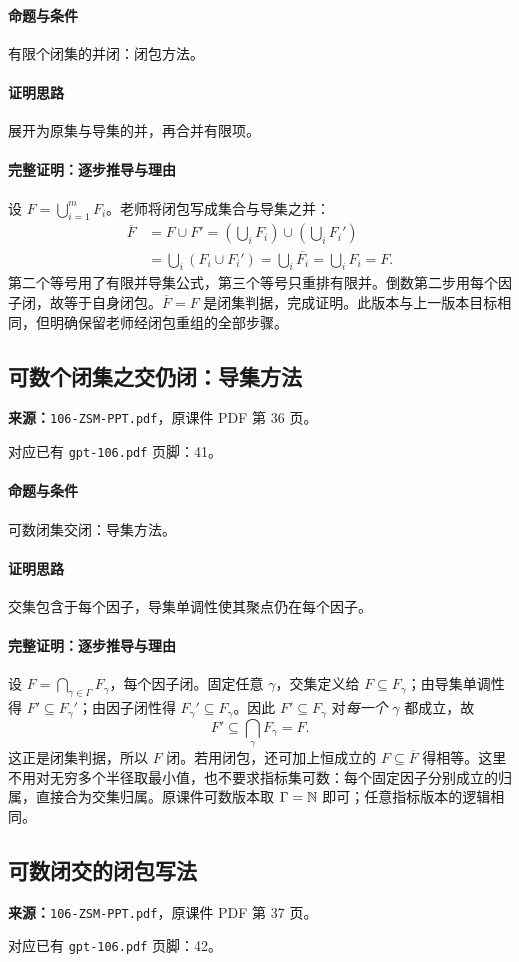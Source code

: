 \paragraph{命题与条件}有限个闭集的并闭：闭包方法。
\paragraph{证明思路}展开为原集与导集的并，再合并有限项。
\paragraph{完整证明：逐步推导与理由}
设 $F=\bigcup_{i=1}^mF_i$。老师将闭包写成集合与导集之并：
\begin{align*}
\overline F&=F\cup F'=\left(\bigcup_iF_i\right)\cup\left(\bigcup_iF_i'\right)\\
&=\bigcup_i(F_i\cup F_i')=\bigcup_i\overline{F_i}=\bigcup_iF_i=F.
\end{align*}
第二个等号用了有限并导集公式，第三个等号只重排有限并。倒数第二步用每个因子闭，故等于自身闭包。$\overline F=F$ 是闭集判据，完成证明。此版本与上一版本目标相同，但明确保留老师经闭包重组的全部步骤。
\clearpage\subsection{可数个闭集之交仍闭：导集方法}
\textbf{来源：}\texttt{106-ZSM-PPT.pdf}，原课件 PDF 第 36 页。\par
对应已有 \texttt{gpt-106.pdf} 页脚：41。\par
\paragraph{命题与条件}可数闭集交闭：导集方法。
\paragraph{证明思路}交集包含于每个因子，导集单调性使其聚点仍在每个因子。
\paragraph{完整证明：逐步推导与理由}
设 $F=\bigcap_{\gamma\in\Gamma}F_\gamma$，每个因子闭。固定任意 $\gamma$，交集定义给 $F\subseteq F_\gamma$；由导集单调性得 $F'\subseteq F_\gamma'$；由因子闭性得 $F_\gamma'\subseteq F_\gamma$。因此 $F'\subseteq F_\gamma$ 对\emph{每一个} $\gamma$ 都成立，故
\[F'\subseteq\bigcap_\gamma F_\gamma=F.\]
这正是闭集判据，所以 $F$ 闭。若用闭包，还可加上恒成立的 $F\subseteq\overline F$ 得相等。这里不用对无穷多个半径取最小值，也不要求指标集可数：每个固定因子分别成立的归属，直接合为交集归属。原课件可数版本取 $\Gamma=\mathbb{N}$ 即可；任意指标版本的逻辑相同。
\clearpage\subsection{可数闭交的闭包写法}
\textbf{来源：}\texttt{106-ZSM-PPT.pdf}，原课件 PDF 第 37 页。\par
对应已有 \texttt{gpt-106.pdf} 页脚：42。\par
